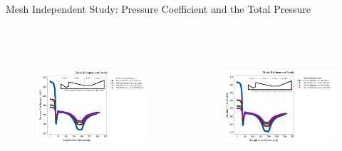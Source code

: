 \begin{frame}{Mesh Independent Study: Pressure Coefficient and the Total Pressure}
    \begin{columns}
      \begin{figure}[h]
      \centering
      \includegraphics[height=4.5cm]{images/MISPCcalibrated.png}
      \label{fig:meshindependentstudy}
      \end{figure}
      \begin{figure}[h]
      \centering
      \includegraphics[height=4.5cm]{images/MISAbsP.png}
      \label{fig:meshindependentstudy}
      \end{figure}
    \end{columns}
\end{frame}

